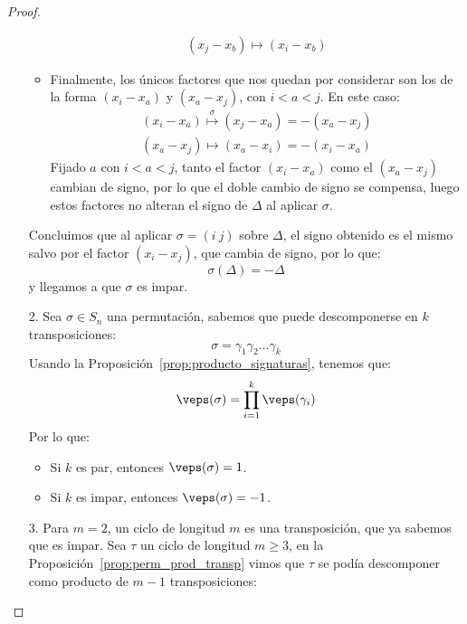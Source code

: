 \begin{coro}
\begin{proof}
\begin{enumerate}
\begin{itemize}
\begin{align*}
                            (x_j - x_b) \longmapsto (x_i - x_b) 
                        \end{align*}
                    \item Finalmente, los únicos factores que nos quedan por considerar son los de la forma $(x_i - x_a)$ y $(x_a - x_j)$, con $i < a < j$. En este caso:
                        \begin{align*}
                            (x_i - x_a) \stackrel{\sigma}{\longmapsto} (x_j - x_a) = -(x_a - x_j) \\
                            (x_a - x_j) \longmapsto (x_a - x_i) = -(x_i - x_a) 
                        \end{align*}
                        Fijado $a$ con $i<a<j$, tanto el factor $(x_i - x_a)$ como el $(x_a - x_j)$ cambian de signo, por lo que el doble cambio de signo se compensa, luego estos factores no alteran el signo de $\Delta$ al aplicar $\sigma$.
                \end{itemize}
                Concluimos que al aplicar $\sigma = (i\ j)$ sobre $\Delta$, el signo obtenido es el mismo salvo por el factor $(x_i - x_j)$, que cambia de signo, por lo que:
                \begin{equation*}
                    \sigma(\Delta) = -\Delta
                \end{equation*}
                y llegamos a que $\sigma$ es impar.
            \item[2.] Sea $\sigma\in S_n$ una permutación, sabemos que puede descomponerse en $k$ transposiciones:
                \begin{equation*}
                    \sigma = \gamma_1\gamma_2\ldots\gamma_k
                \end{equation*}
                Usando la Proposición~\ref{prop:producto_signaturas}, tenemos que:
                \begin{equation*}
                    \veps(\sigma) = \prod_{i=1}^{k}\veps(\gamma_i)
                \end{equation*}
                Por lo que:
                \begin{itemize}
                    \item Si $k$ es par, entonces $\veps(\sigma)=1$.
                    \item Si $k$ es impar, entonces $\veps(\sigma)=-1$.
                \end{itemize}
            \item[3.] Para $m=2$, un ciclo de longitud $m$ es una transposición, que ya sabemos que es impar. Sea $\tau$ un ciclo de longitud $m\geq 3$, en la Proposición~\ref{prop:perm_prod_transp} vimos que $\tau$ se podía descomponer como producto de $m-1$ transposiciones:

\end{enumerate}
\end{proof}
\end{coro}
